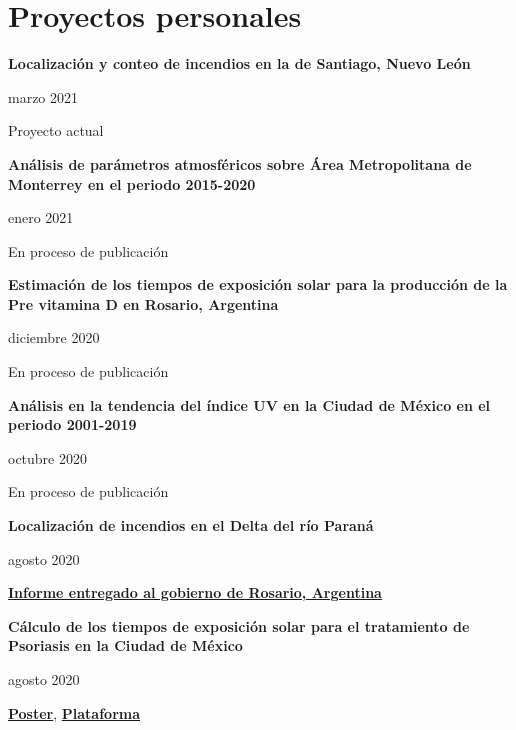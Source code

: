 \documentclass[a3paper]{adcv_color}
\newenvironment{proyects}[2]{\begin{minipage}{0.8\linewidth}\textbf{#1}
\end{minipage}\begin{minipage}{0.2\linewidth}
    \begin{flushright}
      #2
}{\end{flushright}
  \end{minipage}}
\begin{document}
\section{Proyectos personales}
\begin{multicols}{2}
  \begin{proyects}{Localización y conteo de incendios en la de Santiago, Nuevo León}{marzo 2021}
  \end{proyects}

  Proyecto actual

  \begin{proyects}{Análisis de parámetros atmosféricos sobre Área Metropolitana de Monterrey en el periodo 2015-2020}{enero 2021}
  \end{proyects}

  En proceso de publicación

  \begin{proyects}{Estimación de los tiempos de exposición solar para la producción de la Pre vitamina D en Rosario, Argentina}{diciembre 2020}
  \end{proyects}

  En proceso de publicación

  \begin{proyects}{Análisis en la tendencia del índice UV en la Ciudad de México en el periodo 2001-2019}{octubre 2020}
  \end{proyects}

  En proceso de publicación

  \begin{proyects}{Localización de incendios en el Delta del río Paraná}{agosto 2020}
  \end{proyects}

  \href{https://github.com/giovannilopez9808/Posters_templates/blob/master/Informe\%20IFIR/Focos\%20de\%20incendio\%20en\%20las\%20islas\%20del\%20Paran\%C3\%A1\%20\%20frente\%20a\%20Rosario\%20\%20(Piacentini\%2C\%20Ipi\%C3\%B1a\%2C\%20Lopez-Padilla\%2C\%20Bolmaro)\%20(Piacentini).pdf}{\textbf{Informe entregado al gobierno de Rosario, Argentina}}

  \begin{proyects}{Cálculo de los tiempos de exposición solar para el tratamiento de Psoriasis en la Ciudad de México}{agosto 2020}
  \end{proyects}

  \href{https://github.com/giovannilopez9808/Posters_templates/blob/master/2020/CNF/TES/main.pdf}{\textbf{Poster}}, \href{http://tes-v1.herokuapp.com/}{\textbf{Plataforma}}


\end{multicols}
\end{document}

